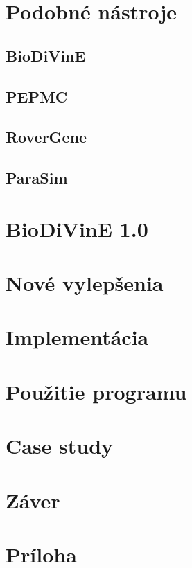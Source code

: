 \documentclass[11pt,final,oneside]{fithesis}
\begin{document}
\chapter{Podobn\' e n\'astroje}

\section{BioDiVinE}

\section{PEPMC}

\section{RoverGene}

\section{ParaSim}


\chapter{BioDiVinE 1.0}


\chapter{Nov\' e vylep\v senia} %


\chapter{Implement\' acia}


\chapter{Pou\v zitie programu}


\chapter{Case study}


\chapter{Z\' aver}


\chapter*{Pr\' iloha}
\end{document}
